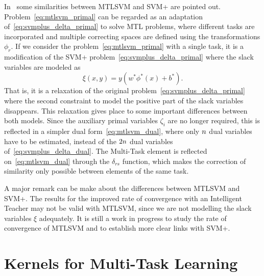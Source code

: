 In~\cite{LiangC08} some similarities between MTLSVM and SVM+ are pointed out. Problem~\eqref{eq:mtlsvm_primal} can be regarded as an adaptation of~\eqref{eq:svmplus_delta_primal} to solve MTL problems, where different tasks are incorporated and multiple correcting spaces are defined using the transformations $\phi_r$.
If we consider the problem~\eqref{eq:mtlsvm_primal} with a single task, it is a modification of the SVM+ problem~\eqref{eq:svmplus_delta_primal} where the slack variables are modeled as
$$ \xi(x, y) = y (w^* \phi^*(x) + b^*)  .$$
That is, it is a relaxation of the original problem~\eqref{eq:svmplus_delta_primal} where the second constraint to model the positive part of the slack variables disappears.
This relaxation gives place to some important differences between both models. Since the auxiliary primal variables $\zeta_i$ are no longer required, this is reflected in a simpler dual form~\eqref{eq:mtlsvm_dual}, where only $n$ dual variables have to be estimated, instead of the $2n$ dual variables of~\eqref{eq:svmplus_delta_dual}.
The Multi-Task element is reflected on~\eqref{eq:mtlsvm_dual} through the $\delta_{rs}$ function, which makes the correction of similarity only possible between elements of the same task.
%

A major remark can be make about the differences between MTLSVM and SVM+. The results for the improved rate of convergence with an Intelligent Teacher may not be valid with MTLSVM, since we are not modelling the slack variables $\xi$ adequately. 
It is still a work in progress to study the rate of convergence of MTLSVM and to establish more clear links with SVM+.







\section{Kernels for Multi-Task Learning}\label{sec:ch3_mtl_kernelmethods}


